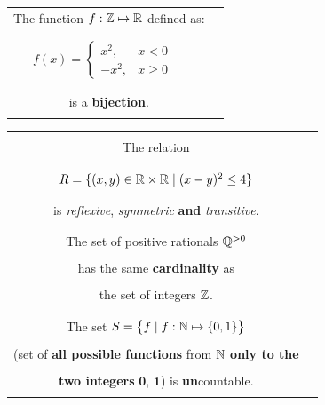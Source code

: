 \documentclass[letterpaper,10pt]{article}
\begin{document}
\begin{center}
\begin{table}[H]
\begin{tabular}{|cc|}
					 					 The function {\Large $f:\mathbb{Z} \mapsto \mathbb{R}$ } defined as: &  \\ & \\ & \\{\Large $f(x) = \begin{cases} x^2, & x < 0 \\ -x^2, & x \geq 0 \end{cases}\quad $ }& \truefalse  \\ & \\ & \\  is a {\bf bijection}. & \\ & \\ \hline 
		\end{tabular}
	\end{table}
\end{center}	

\pagebreak

\begin{center}
	\setlength{\tabcolsep}{40pt}
	\begin{table}[H]
		\centering 
		\large
		\begin{tabular}{|cc|}  \hline & \\ 

					The relation  & \\ &  \\ & \\ {\Large $R = \{ (x, y) \in \mathbb{R} \times \mathbb{R} \mid  (x - y)^2 \leq 4 \}$ }& \truefalse  \\ & \\ & \\  is {\em reflexive}, {\em symmetric} {\bf and} {\em transitive}. & \\ & \\ \hline & \\ 
				The set of positive rationals $\mathbb{Q}^{>0}$   & \\ & \\ 
					has the same \textbf{cardinality} as & \truefalse \\ & \\
					the set of integers $\mathbb{Z}$. &  \\ & \\ \hline	& \\ 				 
					The set {\Large $S = \big \{ f \mid f: \mathbb{N} \mapsto \{0, 1\} \big \} $}& \\ & \\
					(set of \textbf{all possible functions} from $\mathbb{N}$ \textbf{only to the} & \truefalse  \\ 					&  \\ 
					 \textbf{two integers} $\mathbf 0$, $ \mathbf 1$) is {\bf un}countable. & \\ & \\ \hline 
		\end{tabular}
	\end{table}
\end{center}	
\end{document}
